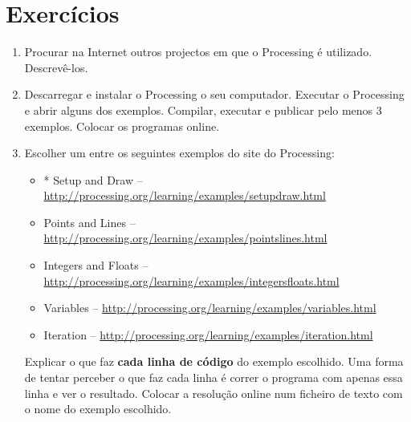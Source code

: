 \section{Exercícios}
\begin{enumerate}

\item 
Procurar na Internet outros projectos em que o Processing é utilizado. Descrevê-los.

\item 
Descarregar e instalar o Processing o seu computador.
Executar o Processing e abrir alguns dos exemplos. Compilar, executar e publicar pelo menos 3 exemplos. Colocar os programas online.

\item
Escolher um entre os seguintes exemplos do site do Processing:
\begin{itemize}
\item \label{exe:2_1}
*
Setup and Draw -- \url{http://processing.org/learning/examples/setupdraw.html}

\item
Points and Lines -- \url{http://processing.org/learning/examples/pointslines.html}

\item
Integers and Floats -- \url{http://processing.org/learning/examples/integersfloats.html}

\item
Variables -- \url{http://processing.org/learning/examples/variables.html}

\item
Iteration -- \url{http://processing.org/learning/examples/iteration.html}
\end{itemize}
Explicar o que faz \textbf{cada linha de código} do exemplo escolhido. Uma forma de tentar perceber o que faz cada linha é correr o programa com apenas essa linha e ver o resultado. Colocar a resolução online num ficheiro de texto com o nome do exemplo escolhido.
\end{enumerate}